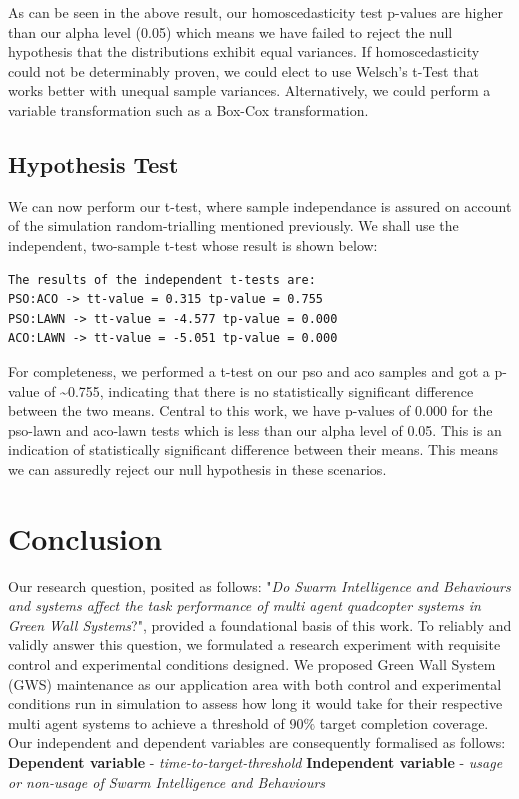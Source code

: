 \documentclass{report}
\begin{document}
As can be seen in the above result, our homoscedasticity test p-values are higher than our alpha level (0.05) which means we have failed to reject the null hypothesis that the distributions exhibit equal variances. If homoscedasticity could not be determinably proven, we could elect to use Welsch's t-Test that works better with unequal sample variances. Alternatively, we could perform a variable transformation such as a Box-Cox transformation.

\section{Hypothesis Test}\label{hypothesis-test}

We can now perform our t-test, where sample independance is assured on
account of the simulation random-trialling mentioned previously. We
shall use the independent, two-sample t-test whose result is shown below:

\begin{Verbatim}[commandchars=\\\{\}]
The results of the independent t-tests are: 
PSO:ACO -> tt-value = 0.315 tp-value = 0.755 
PSO:LAWN -> tt-value = -4.577 tp-value = 0.000 
ACO:LAWN -> tt-value = -5.051 tp-value = 0.000

\end{Verbatim}

For completeness, we performed a t-test on our pso and aco samples and got a p-value of \textasciitilde{}0.755, indicating that there is no statistically significant difference between the two means. Central to this work, we have p-values of 0.000 for the pso-lawn and aco-lawn tests which is less than our alpha level of 0.05. This is an indication of statistically significant difference between their means. This means we can assuredly reject our null hypothesis in these scenarios.


\chapter{Conclusion} \label{conclusion}

Our research question, posited as follows: "\textit{Do Swarm Intelligence and Behaviours and systems affect the task performance of multi agent quadcopter systems in Green Wall Systems}?", provided a foundational basis of this work. To reliably and validly answer this question, we formulated a research experiment with requisite control and experimental conditions designed. We proposed Green Wall System (GWS) maintenance as our application area with both control and experimental conditions run in simulation to assess how long it would take for their respective multi agent systems to achieve a threshold of $90\%$ target completion coverage. Our independent and dependent variables are consequently formalised as follows:
\vskip 0.5cm
\textbf{Dependent variable} - \textit{time-to-target-threshold}
\vskip 0.1cm
\textbf{Independent variable} - \textit{usage or non-usage of Swarm Intelligence and Behaviours}
\vskip 0.5cm
\end{document}
